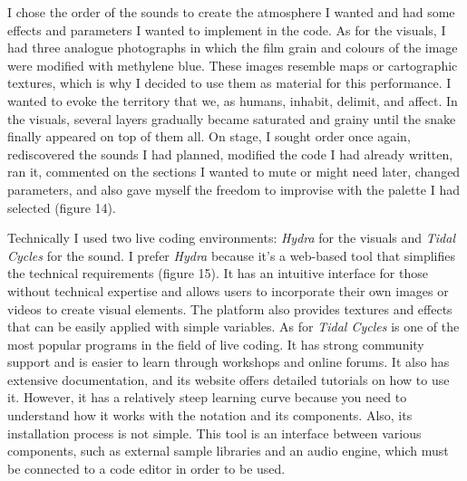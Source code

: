 \documentclass[12pt, twoside, a4paper]{report}
\begin{document}
I chose the order of the sounds to create the atmosphere I wanted and had some effects and parameters I wanted to implement in the code. As for the visuals, I had three analogue photographs in which the film grain and colours of the image were modified with methylene blue. These images resemble maps or cartographic textures, which is why I decided to use them as material for this performance. I wanted to evoke the territory that we, as humans, inhabit, delimit, and affect. In the visuals, several layers gradually became saturated and grainy until the snake finally appeared on top of them all. On stage, I sought order once again, rediscovered the sounds I had planned, modified the code I had already written, ran it, commented on the sections I wanted to mute or might need later, changed parameters, and also gave myself the freedom to improvise with the palette I had selected (figure 14).

Technically I used two live coding environments: \textit{Hydra} for the visuals and \textit{Tidal Cycles} for the sound. I prefer \textit{Hydra} because it’s a web-based tool that simplifies the technical requirements (figure 15). It has an intuitive interface for those without technical expertise and allows users to incorporate their own images or videos to create visual elements. The platform also provides textures and effects that can be easily applied with simple variables. As for \textit{Tidal Cycles} is one of the most popular programs in the field of live coding. It has strong community support and is easier to learn through workshops and online forums. It also has extensive documentation, and its website offers detailed tutorials on how to use it. However, it has a relatively steep learning curve because you need to understand how it works with the notation and its components. Also, its installation process is not simple. 
This tool is an interface between various components, such as external sample libraries and an audio engine, which must be connected to a code editor in order to be used. 



\end{document}
